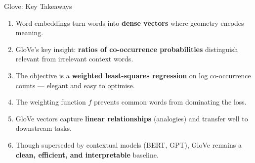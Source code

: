 \documentclass[11pt,aspectratio=169,professionalfonts]{beamer}
\begin{document}
%
\begin{frame}{Glove: Key Takeaways}
  \begin{enumerate}
    \item Word embeddings turn words into \textbf{dense vectors} where geometry encodes meaning.

    \vspace{3pt}
    \item GloVe's key insight: \textbf{ratios of co-occurrence probabilities} distinguish relevant from irrelevant context words.

    \vspace{3pt}
    \item The objective is a \textbf{weighted least-squares regression} on log co-occurrence counts --- elegant and easy to optimise.

    \vspace{3pt}
    \item The weighting function $f$ prevents common words from dominating the loss.

    \vspace{3pt}
    \item GloVe vectors capture \textbf{linear relationships} (analogies) and transfer well to downstream tasks.

    \vspace{3pt}
    \item Though superseded by contextual models (BERT, GPT), GloVe remains a \textbf{clean, efficient, and interpretable} baseline.
  \end{enumerate}
\end{frame}
%
\end{document}
